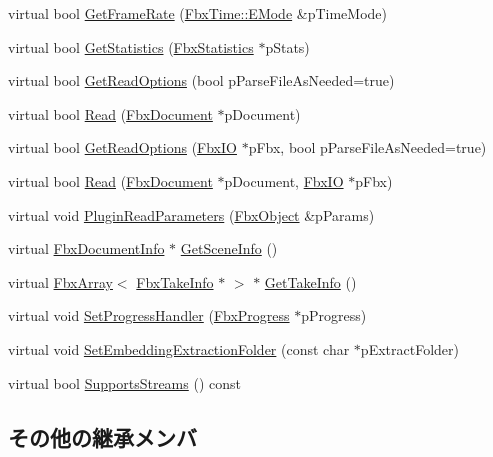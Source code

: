 \begin{DoxyCompactItemize}
virtual bool \hyperlink{class_fbx_reader_fbx6_ad4ae4c4949d316491f937a0ff75c6ed7}{Get\+Frame\+Rate} (\hyperlink{class_fbx_time_acc529b00a0e8d4c3da3702449ca93031}{Fbx\+Time\+::\+E\+Mode} \&p\+Time\+Mode)
\item 
virtual bool \hyperlink{class_fbx_reader_fbx6_a72865fb347314f30b81b56767fe91a5b}{Get\+Statistics} (\hyperlink{class_fbx_statistics}{Fbx\+Statistics} $\ast$p\+Stats)
\item 
virtual bool \hyperlink{class_fbx_reader_fbx6_afe24d36b1c38806c9ace6a6d1a782b88}{Get\+Read\+Options} (bool p\+Parse\+File\+As\+Needed=true)
\item 
virtual bool \hyperlink{class_fbx_reader_fbx6_ab16aeaede33ca635a0493069aac4fbea}{Read} (\hyperlink{class_fbx_document}{Fbx\+Document} $\ast$p\+Document)
\item 
virtual bool \hyperlink{class_fbx_reader_fbx6_aad5666cba24ae32ea43085227e8497fc}{Get\+Read\+Options} (\hyperlink{class_fbx_i_o}{Fbx\+IO} $\ast$p\+Fbx, bool p\+Parse\+File\+As\+Needed=true)
\item 
virtual bool \hyperlink{class_fbx_reader_fbx6_aaf4d83d83558463da215d522cb1c4503}{Read} (\hyperlink{class_fbx_document}{Fbx\+Document} $\ast$p\+Document, \hyperlink{class_fbx_i_o}{Fbx\+IO} $\ast$p\+Fbx)
\item 
virtual void \hyperlink{class_fbx_reader_fbx6_a1a3544b766bd03dc4b1141ba4f93b03f}{Plugin\+Read\+Parameters} (\hyperlink{class_fbx_object}{Fbx\+Object} \&p\+Params)
\item 
virtual \hyperlink{class_fbx_document_info}{Fbx\+Document\+Info} $\ast$ \hyperlink{class_fbx_reader_fbx6_a62e8d566653eccca7e4b7c914f7a9a5e}{Get\+Scene\+Info} ()
\item 
virtual \hyperlink{class_fbx_array}{Fbx\+Array}$<$ \hyperlink{class_fbx_take_info}{Fbx\+Take\+Info} $\ast$ $>$ $\ast$ \hyperlink{class_fbx_reader_fbx6_a6f90870b7572e7fcbc9832679a89d5f4}{Get\+Take\+Info} ()
\item 
virtual void \hyperlink{class_fbx_reader_fbx6_a85827a96cd550f6260854858766e4d96}{Set\+Progress\+Handler} (\hyperlink{class_fbx_progress}{Fbx\+Progress} $\ast$p\+Progress)
\item 
virtual void \hyperlink{class_fbx_reader_fbx6_a574e93fb5fc9fd89050b11c383316ab2}{Set\+Embedding\+Extraction\+Folder} (const char $\ast$p\+Extract\+Folder)
\item 
virtual bool \hyperlink{class_fbx_reader_fbx6_ad38deb810e2c73562b9748486f4476bb}{Supports\+Streams} () const
\end{DoxyCompactItemize}
\subsection*{その他の継承メンバ}


